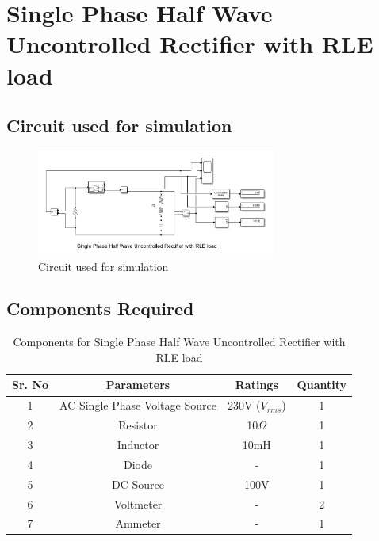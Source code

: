 \section{Single Phase Half Wave Uncontrolled Rectifier with RLE load}

\subsection{Circuit used for simulation}

\begin{figure}[h]
    \centering
    \includegraphics[width=0.7\textwidth]{images/experiment-1/circuit-diagram-simulation-04.png}
    \caption{Circuit used for simulation}
    \label{Fig_simulation_circuit_single-phase-half-wave-uncontrolled-rectifier-with-RLE-load}
\end{figure}

\subsection{Components Required}

\begin{table}[h]
    \renewcommand{\arraystretch}{1.3}
    \label{table_components_required_circuit_4}
    \centering
    \begin{tabular}{|c|c|c|c|}
        \hline
        Sr. No & Parameters                     & Ratings            & Quantity \\
        \hline
        \hline
        1      & AC Single Phase Voltage Source & 230V ($ V_{rms} $) & 1        \\
        \hline
        2      & Resistor                       & 10$ \Omega $       & 1        \\
        \hline
        3      & Inductor                       & 10mH               & 1        \\
        \hline
        4      & Diode                          & -                  & 1        \\
        \hline
        5      & DC Source                      & 100V               & 1        \\
        \hline
        6      & Voltmeter                      & -                  & 2        \\
        \hline
        7      & Ammeter                        & -                  & 1        \\
        \hline
    \end{tabular}
    \caption{Components for Single Phase Half Wave Uncontrolled Rectifier with RLE load}
\end{table}




